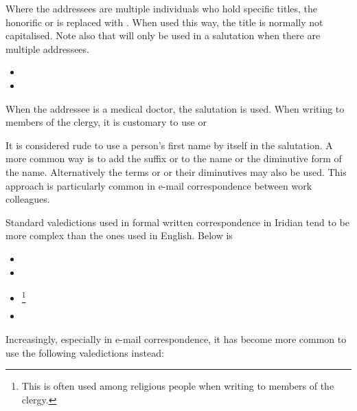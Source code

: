 Where the addressees are multiple individuals who hold specific titles, the
honorific  or  is replaced with . When used this way, the title is normally not capitalised. Note
also that  will only be used in a salutation when there are
multiple addressees.

\begin{itemize}[nosep]
	\item {}
	\item {}
\end{itemize}

When the addressee is a medical doctor, the salutation  is
used. When writing to members of the clergy, it is customary to use
 or 

It is considered rude to use a person's first name by itself in the salutation.
A more common way is to add the suffix  or  to
the name or the diminutive form of the name. Alternatively the terms
 or  or their diminutives
may also be used. This approach is particularly common in e-mail correspondence
between work colleagues.

Standard valedictions used in formal written
correspondence in Iridian tend
to be more complex than the ones used in English. Below is 

\begin{itemize}[nosep]
	\item {}
	\item {}
	\item {}\footnote{This is often used among religious people when writing to members of the clergy.}
	\item {}

\end{itemize}

Increasingly, especially in e-mail correspondence, it has become
more common to use the following valedictions instead:

